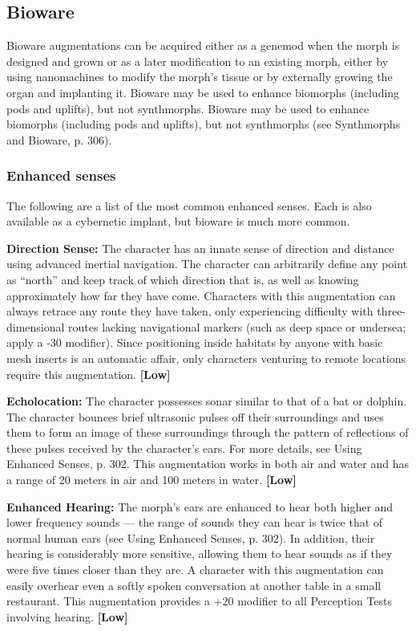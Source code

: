 \subsection{Bioware} \label{sec:bioware} 

Bioware augmentations can be acquired either as a genemod when the morph is designed and grown or as a later modification to an existing morph, either by using nanomachines to modify the morph’s tissue or by externally growing the organ and implanting it. Bioware may be used to enhance biomorphs (including pods and uplifts), but not synthmorphs. Bioware may be used to enhance biomorphs (including pods and uplifts), but not synthmorphs (see Synthmorphs and Bioware, p. 306). 

\subsubsection{Enhanced senses} 

The following are a list of the most common enhanced senses. Each is also available as a cybernetic implant, but bioware is much more common. 

\textbf{Direction Sense:} The character has an innate sense of direction and distance using advanced inertial navigation. The character can arbitrarily define any point as ``north'' and keep track of which direction that is, as well as knowing approximately how far they have come. Characters with this augmentation can always retrace any route they have taken, only experiencing difficulty with three-dimensional routes lacking navigational markers (such as deep space or undersea; apply a -30 modifier). Since positioning inside habitats by anyone with basic mesh inserts is an automatic affair, only characters venturing to remote locations require this augmentation. \textbf{[Low]} 

\textbf{Echolocation:} The character possesses sonar similar to that of a bat or dolphin. The character bounces brief ultrasonic pulses off their surroundings and uses them to form an image of these surroundings through the pattern of reflections of these pulses received by the character’s ears. For more details, see Using Enhanced Senses, p. 302. This augmentation works in both air and water and has a range of 20 meters in air and 100 meters in water. \textbf{[Low]} 

\textbf{Enhanced Hearing:} The morph’s ears are enhanced to hear both higher and lower frequency sounds --- the range of sounds they can hear is twice that of normal human ears (see Using Enhanced Senses, p. 302). In addition, their hearing is considerably more sensitive, allowing them to hear sounds as if they were five times closer than they are. A character with this augmentation can easily overhear even a softly spoken conversation at another table in a small restaurant. This augmentation provides a +20 modifier to all Perception Tests involving hearing. \textbf{[Low]} 

